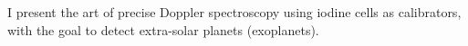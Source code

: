 I present the art of precise Doppler spectroscopy using iodine cells
as calibrators, with the goal to detect extra-solar planets (exoplanets).
